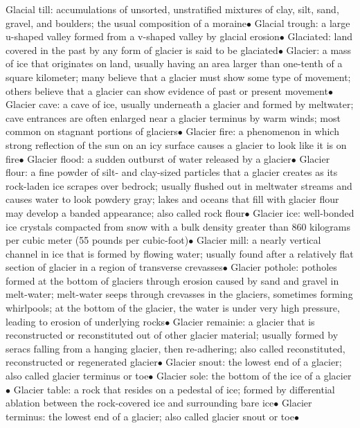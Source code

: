 \documentclass{article}
\newcommand{\ddd}{$\bullet$}
\begin{document}
\begin{multicols*}{4}
        Glacial till: accumulations of unsorted, unstratified mixtures of clay, silt, sand, gravel, and boulders; the usual composition of a moraine\ddd
        Glacial trough: a large u-shaped valley formed from a v-shaped valley by glacial erosion\ddd
        Glaciated: land covered in the past by any form of glacier is said to be glaciated\ddd
        Glacier: a mass of ice that originates on land, usually having an area larger than one-tenth of a square kilometer; many believe that a glacier must show some type of movement; others believe that a glacier can show evidence of past or present movement\ddd
        Glacier cave: a cave of ice, usually underneath a glacier and formed by meltwater; cave entrances are often enlarged near a glacier terminus by warm winds; most common on stagnant portions of glaciers\ddd
        Glacier fire: a phenomenon in which strong reflection of the sun on an icy surface causes a glacier to look like it is on fire\ddd
        Glacier flood: a sudden outburst of water released by a glacier\ddd
        Glacier flour: a fine powder of silt- and clay-sized particles that a glacier creates as its rock-laden ice scrapes over bedrock; usually flushed out in meltwater streams and causes water to look powdery gray; lakes and oceans that fill with glacier flour may develop a banded appearance; also called rock flour\ddd
        Glacier ice: well-bonded ice crystals compacted from snow with a bulk density greater than 860 kilograms per cubic meter (55 pounds per cubic-foot)\ddd
        Glacier mill: a nearly vertical channel in ice that is formed by flowing water; usually found after a relatively flat section of glacier in a region of transverse crevasses\ddd
        Glacier pothole: potholes formed at the bottom of glaciers through erosion caused by sand and gravel in melt-water; melt-water seeps through crevasses in the glaciers, sometimes forming whirlpools; at the bottom of the glacier, the water is under very high pressure, leading to erosion of underlying rocks\ddd
        Glacier remainie: a glacier that is reconstructed or reconstituted out of other glacier material; usually formed by seracs falling from a hanging glacier, then re-adhering; also called reconstituted, reconstructed or regenerated glacier\ddd
        Glacier snout: the lowest end of a glacier; also called glacier terminus or toe\ddd
        Glacier sole: the bottom of the ice of a glacier\ddd
        Glacier table: a rock that resides on a pedestal of ice; formed by differential ablation between the rock-covered ice and surrounding bare ice\ddd
        Glacier terminus: the lowest end of a glacier; also called glacier snout or toe\ddd

\end{multicols*}
\end{document}

